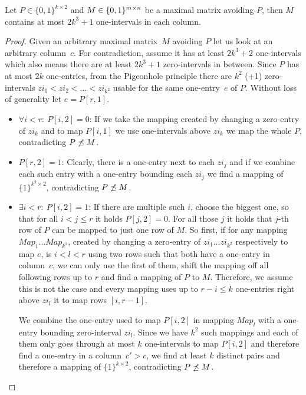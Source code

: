 \begin{lemma}
\label{twocols2}
Let $P\in\{0,1\}^{k\times 2}$ and $M\in\{0,1\}^{m\times n}$ be a maximal matrix avoiding $P$, then $M$ contains at most $2k^3+1$ one-intervals in each column.
\end{lemma}
\begin{proof}
Given an arbitrary maximal matrix~$M$ avoiding $P$ let us look at an arbitrary column~$c$. For contradiction, assume it has at least $2k^3+2$ one-intervals which also means there are at least $2k^3+1$ zero-intervals in between. Since $P$ has at most $2k$ one-entries, from the Pigeonhole principle there are $k^2$ (+1) zero-intervals $zi_1<zi_2<\dots<zi_{k^2}$ usable for the same one-entry~$e$ of $P$. Without loss of generality let $e=P[r,1]$.
\begin{itemize}
	\item $\forall i<r:\ P[i,2]=0$: If we take the mapping created by changing a zero-entry of $zi_k$ and to map $P[i,1]$ we use one-intervals above $zi_k$ we map the whole $P$, contradicting $P\not\preceq M$.
	\item $P[r,2]=1$: Clearly, there is a one-entry next to each $zi_j$ and if we combine each such entry with a one-entry bounding each $zi_j$ we find a mapping of $\{1\}^{k^2\times2}$, contradicting $P\not\preceq M$.
	\item $\exists i<r:\ P[i,2]=1$: If there are multiple such $i$, choose the biggest one, so that for all $i<j\leq r$ it holds $P[j,2]=0$. For all those $j$ it holds that $j$-th row of $P$ can be mapped to just one row of $M$. So first, if for any mapping $Map_1\dots Map_{k^2}$, created by changing a zero-entry of $zi_1\dots zi_{k^2}$ respectively to map $e$, is $i<l<r$ using two rows such that both have a one-entry in column~$c$, we can only use the first of them, shift the mapping off all following rows up to $r$ and find a mapping of $P$ to $M$. Therefore, we assume this is not the case and every mapping uses up to $r-i\leq k$ one-entries right above $zi_l$ it to map rows $[i,r-1]$.
	
		We combine the one-entry used to map $P[i,2]$ in mapping $Map_l$ with a one-entry bounding zero-interval $zi_l$. Since we have $k^2$ such mappings and each of them only goes through at most $k$ one-intervals to map $P[i,2]$ and therefore find a one-entry in a column~$c'>c$, we find at least $k$ distinct pairs and therefore a mapping of $\{1\}^{k\times2}$, contradicting $P\not\preceq M$.
\end{itemize}
\end{proof}

